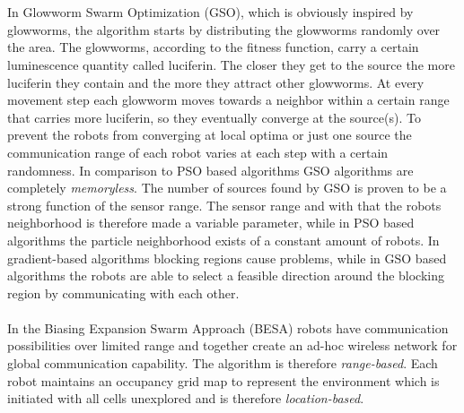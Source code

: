 		\\ \\
		In Glowworm Swarm Optimization (GSO), which is obviously inspired by glowworms, the algorithm starts by distributing the glowworms randomly over the area.
		The glowworms, according to the fitness function, carry a certain luminescence quantity called luciferin. 
		The closer they get to the source the more luciferin they contain and the more they attract other glowworms. 
		At every movement step each glowworm moves towards a neighbor within a certain range that carries more luciferin, so they eventually converge at the source(s). 
		To prevent the robots from converging at local optima or just one source the communication range of each robot varies at each step with a certain randomness.
		In comparison to PSO based algorithms GSO algorithms are completely \emph{memoryless}.
		The number of sources found by GSO is proven to be a strong function of the sensor range.
		The sensor range and with that the robots neighborhood is therefore made a variable parameter, while in PSO based algorithms the particle neighborhood exists of a constant amount of robots.
		In gradient-based algorithms blocking regions cause problems, while in GSO based algorithms the robots are able to select a feasible direction around the blocking region by communicating with each other. \cite{krishnanand2005detection}
		\\ \\
		In the Biasing Expansion Swarm Approach (BESA) robots have communication possibilities over limited range and together create an ad-hoc wireless network for global communication capability.
		The algorithm is therefore \emph{range-based}.
		Each robot maintains an occupancy grid map to represent the environment which is initiated with all cells unexplored and is therefore \emph{location-based}.
